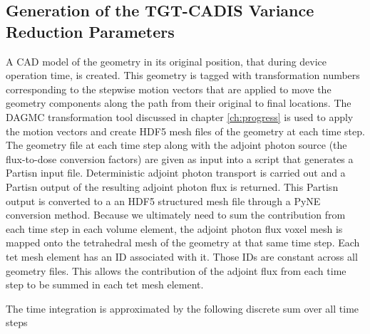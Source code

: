 

\subsection{Generation of the TGT-CADIS Variance Reduction Parameters}
A CAD model of the geometry in its original position, that during device
operation time, is created.  This geometry is tagged with transformation
numbers corresponding to the stepwise motion vectors that are applied to move the
geometry components along the path from their original to final locations.  The DAGMC
transformation tool discussed in chapter \ref{ch:progress} is used to apply 
the motion vectors and create HDF5 mesh files of the geometry at each time step.   
The geometry file at each time step along with the adjoint photon source (the
flux-to-dose conversion factors) are given as input into a script that
generates a Partisn input file.  Deterministic adjoint photon transport is
carried out and a Partisn output of the resulting adjoint photon flux is
returned.  This Partisn output is converted to a an HDF5 structured mesh file
through a PyNE conversion method.  
Because we ultimately need to sum the contribution from each time step in each
volume element, the adjoint photon flux voxel mesh is mapped onto the
tetrahedral mesh of the geometry at that same time step.  Each tet
mesh element has an ID associated with it.  Those IDs are constant across all
geometry files.  This allows the contribution of the adjoint flux from each
time step to be summed in each tet mesh element.

The time integration is approximated by the following discrete sum over all
time steps

